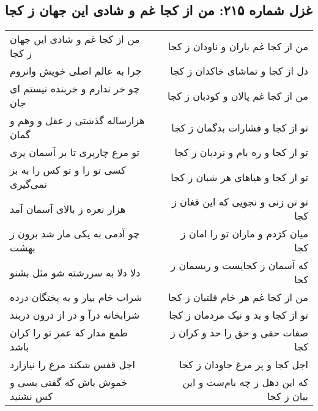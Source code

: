 \begin{center}
\section*{غزل شماره ۲۱۵: من از کجا غم و شادی این جهان ز کجا}
\label{sec:0215}
\begin{longtable}{l p{0.5cm} r}
من از کجا غم و شادی این جهان ز کجا
&&
من از کجا غم باران و ناودان ز کجا
\\
چرا به عالم اصلی خویش وانروم
&&
دل از کجا و تماشای خاکدان ز کجا
\\
چو خر ندارم و خربنده نیستم ای جان
&&
من از کجا غم پالان و کودبان ز کجا
\\
هزارساله گذشتی ز عقل و وهم و گمان
&&
تو از کجا و فشارات بدگمان ز کجا
\\
تو مرغ چارپری تا بر آسمان پری
&&
تو از کجا و ره بام و نردبان ز کجا
\\
کسی تو را و تو کس را به بز نمی‌گیری
&&
تو از کجا و هیاهای هر شبان ز کجا
\\
هزار نعره ز بالای آسمان آمد
&&
تو تن زنی و نجویی که این فغان ز کجا
\\
چو آدمی به یکی مار شد برون ز بهشت
&&
میان کژدم و ماران تو را امان ز کجا
\\
دلا دلا به سررشته شو مثل بشنو
&&
که آسمان ز کجایست و ریسمان ز کجا
\\
شراب خام بیار و به پختگان درده
&&
من از کجا غم هر خام قلتبان ز کجا
\\
شرابخانه درآ و در از درون دربند
&&
تو از کجا و بد و نیک مردمان ز کجا
\\
طمع مدار که عمر تو را کران باشد
&&
صفات حقی و حق را حد و کران ز کجا
\\
اجل قفس شکند مرغ را نیازارد
&&
اجل کجا و پر مرغ جاودان ز کجا
\\
خموش باش که گفتی بسی و کس نشنید
&&
که این دهل ز چه بام‌ست و این بیان ز کجا
\\
\end{longtable}
\end{center}
